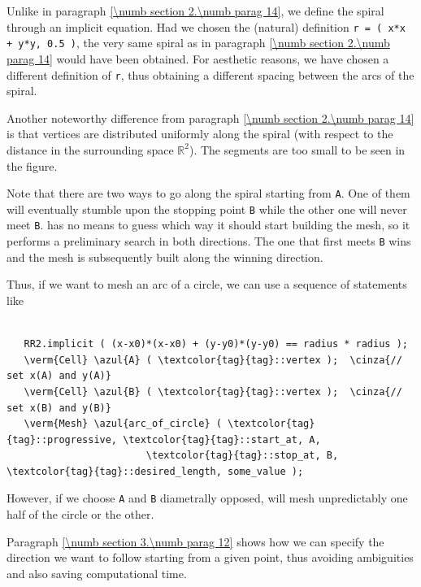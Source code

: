 Unlike in paragraph \ref{\numb section 2.\numb parag 14}, we define the spiral through
an implicit equation.
Had we chosen the (natural) definition {\small\tt r =  ( x*x + y*y, 0.5 )},
the very same spiral as in paragraph \ref{\numb section 2.\numb parag 14} would have been
obtained.
For aesthetic reasons, we have chosen a different definition of {\small\tt r}, thus obtaining
a different spacing between the arcs of the spiral.

Another noteworthy difference from paragraph \ref{\numb section 2.\numb parag 14} is that
vertices are distributed uniformly along the spiral (with respect to the distance
in the surrounding space $ \mathbb{R}^2 $).
The segments are too small to be seen in the figure.

Note that there are two ways to go along the spiral starting from {\small\tt A}.
One of them will eventually stumble upon the stopping point {\small\tt B} while
the other one will never meet {\small\tt B}.
{\ManiFEM} has no means to guess which way it should start building the mesh,
so it performs a preliminary search in both directions.
The one that first meets {\small\tt B} wins and the mesh is subsequently built along
the winning direction.

Thus, if we want to mesh an arc of a circle, we can use a sequence of statements like

\begin{Verbatim}[commandchars=\\\{\},formatcom=\small\tt,
   baselinestretch=0.94,framesep=2mm                      ]

   RR2.implicit ( (x-x0)*(x-x0) + (y-y0)*(y-y0) == radius * radius );
   \verm{Cell} \azul{A} ( \textcolor{tag}{tag}::vertex );  \cinza{// set x(A) and y(A)}
   \verm{Cell} \azul{B} ( \textcolor{tag}{tag}::vertex );  \cinza{// set x(B) and y(B)}
   \verm{Mesh} \azul{arc_of_circle} ( \textcolor{tag}{tag}::progressive, \textcolor{tag}{tag}::start_at, A,
                        \textcolor{tag}{tag}::stop_at, B, \textcolor{tag}{tag}::desired_length, some_value );
\end{Verbatim}

However, if we choose {\small\tt A} and {\small\tt B} diametrally opposed, {\maniFEM} will
mesh unpredictably one half of the circle or the other.

Paragraph \ref{\numb section 3.\numb parag 12} shows how we can specify the direction we
want to follow starting from a given point, thus avoiding ambiguities and also saving
computational time.

